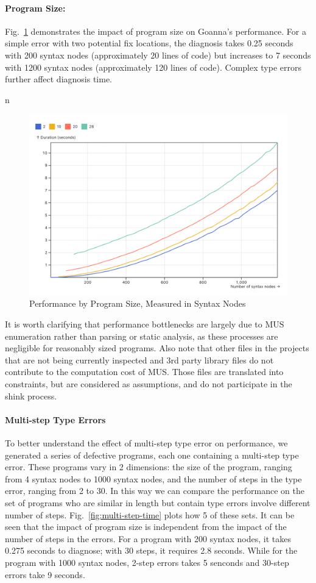 \documentclass[pdflatex,sn-nature,Numbered]{sn-jnl}%
\begin{document}
\paragraph{Program Size:} Fig.~\ref{fig:node-size} demonstrates the impact of program size on Goanna's performance. For a simple error with two potential fix locations, the diagnosis takes 0.25 seconds with 200 syntax nodes (approximately 20 lines of code) but increases to 7 seconds with 1200 syntax nodes (approximately 120 lines of code). Complex type errors further affect diagnosis time.

n\begin{figure}[ht]
    \centering
    \includegraphics[width=0.8\linewidth]{images/program-size.png}
    \caption{Performance by Program Size, Measured in Syntax Nodes}
    \label{fig:node-size}
\end{figure}

It is worth clarifying that performance bottlenecks are largely due to MUS enumeration rather than parsing or static analysis, as these processes are negligible for reasonably sized programs. Also note that other files in the projects that are not being currently inspected and 3rd party library files do not contribute to the computation cost of MUS. Those files are translated into constraints, but are considered as assumptions, and do not participate in the shink process.

\paragraph{Multi-step Type Errors}

To better understand the effect of multi-step type error on performance, we generated a series of defective programs, each one containing a multi-step type error. These programs vary in 2 dimensions: the size of the program, ranging from 4 syntax nodes to 1000 syntax nodes, and the number of steps in the type error, ranging from 2 to 30. In this way we can compare the performance on the set of programs who are similar in length but contain type errors involve different number of steps. Fig.~\ref{fig:multi-step-time} plots how 5 of these sets.  It can be seen that the impact of program size is independent from the impact of the number of steps in the errors. For a program with 200 syntax nodes, it takes 0.275 seconds to diagnose; with 30 steps, it requires 2.8 seconds. While for the program with 1000 syntax nodes, 2-step errors takes 5 senconds and 30-step errors take 9 seconds.
\end{document}
